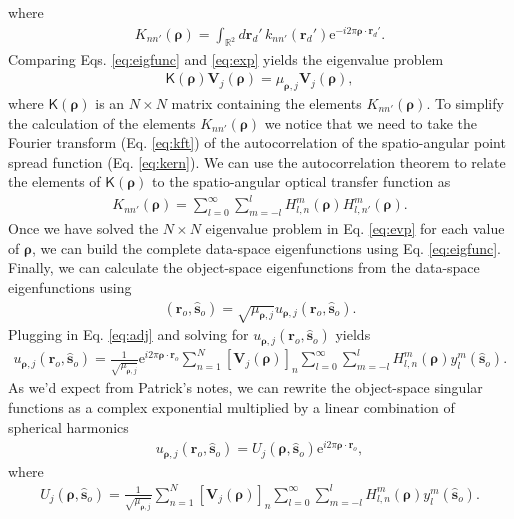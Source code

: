 \documentclass[11pt]{article}
\newcommand{\me}{\mathrm{e}}
\providecommand{\mb}[1]{\mathbf{#1}}
\providecommand{\ro}[1]{\mathbf{\mathbf{r}}_o}
\providecommand{\so}[1]{\mathbf{\hat{s}}_o}
\providecommand{\rd}[1]{\mathbf{r}_d}
\providecommand{\mbb}[1]{\mathbb{#1}}
\providecommand{\bs}[1]{\boldsymbol{#1}}
\begin{document}
where
\begin{align}
  K_{nn'}(\bs{\rho}) = \int_{\mbb{R}^2}d\rd{}'\, k_{nn'}(\rd{}')\me{}^{-i 2\pi \bs{\rho}\cdot\rd{}'}. \label{eq:kft}
\end{align}
Comparing Eqs. \ref{eq:eigfunc} and \ref{eq:exp} yields the eigenvalue problem
\begin{align}
  \mathsf{K}(\bs{\rho})\mb{V}_j(\bs{\rho}) = \mu_{\bs{\rho}, j}\mb{V}_j(\bs{\rho}), \label{eq:evp}
\end{align}
where $\mathsf{K}(\bs{\rho})$ is an $N\times N$ matrix containing the elements
$K_{nn'}(\bs{\rho})$. To simplify the calculation of the elements
$K_{nn'}(\bs{\rho})$ we notice that we need to take the Fourier transform (Eq.
\ref{eq:kft}) of the autocorrelation of the spatio-angular point spread function
(Eq. \ref{eq:kern}). We can use the autocorrelation theorem to relate the
elements of $\mathsf{K}(\bs{\rho})$ to the spatio-angular optical transfer
function as
\begin{align}
  K_{nn'}(\bs{\rho}) = \sum_{l=0}^{\infty}\sum_{m=-l}^l H_{l,n}^m(\bs{\rho}) H_{l,n'}^m(\bs{\rho}). \label{eq:ksimp}
\end{align}
Once we have solved the $N\times N$ eigenvalue problem in Eq. \ref{eq:evp} for
each value of $\bs{\rho}$, we can build the complete data-space eigenfunctions using
Eq. \ref{eq:eigfunc}. Finally, we can calculate the object-space eigenfunctions from
the data-space eigenfunctions using
\begin{align}
  [\mathcal{H}^{\dagger}\mb{v}_{\bs{\rho},j}](\ro{}, \so{}) = \sqrt{\mu_{\bs{\rho}, j}}u_{\bs{\rho},j}(\ro{}, \so{}).
\end{align}
Plugging in Eq. \ref{eq:adj} and solving for $u_{\bs{\rho},j}(\ro{}, \so{})$ yields
\begin{align}
  u_{\bs{\rho},j}(\ro{}, \so{}) = \frac{1}{\sqrt{\mu_{\bs{\rho},j}}}\me{}^{i2\pi\bs{\rho}\cdot\ro{}}\sum_{n=1}^N[\mb{V}_j(\bs{\rho})]_n \sum_{l=0}^{\infty}\sum_{m=-l}^l H_{l,n}^m(\bs{\rho})y_l^m(\so{}).
\end{align}
As we'd expect from Patrick's notes, we can rewrite the object-space singular
functions as a complex exponential multiplied by a linear combination of
spherical harmonics
\begin{align}
u_{\bs{\rho},j}(\ro{}, \so{}) = U_j(\bs{\rho}, \so{}) \me{}^{i2\pi\bs{\rho}\cdot\ro{}},
\end{align}
where
\begin{align}
  U_{j}(\bs{\rho}, \so{}) = \frac{1}{\sqrt{\mu_{\bs{\rho},j}}}\sum_{n=1}^N[\mb{V}_j(\bs{\rho})]_n \sum_{l=0}^{\infty}\sum_{m=-l}^l H_{l,n}^m(\bs{\rho})y_l^m(\so{}).
\end{align}
\end{document}
